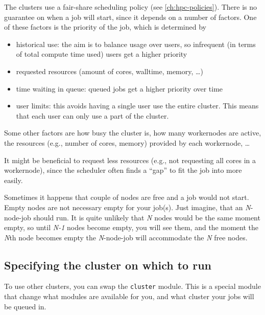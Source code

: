 The \hpcInfra clusters use a fair-share scheduling policy (see \autoref{ch:hpc-policies}). There is no guarantee on when a
job will start, since it depends on a number of factors. One of these factors is
the priority of the job, which is determined by
\begin{itemize}
    \item historical use: the aim is to balance usage over users, so
        infrequent (in terms of total compute time used) users get a higher priority

    \item requested resources (amount of cores, walltime, memory, \ldots)

    \item time waiting in queue: queued jobs get a higher priority over time

    \item user limits: this avoids having a single user use the entire cluster.
        This means that each user can only use a part of the cluster.

\end{itemize}
Some other factors are how busy the cluster is, how many workernodes are active,
the resources (e.g., number of cores, memory) provided by each workernode, \ldots

It might be beneficial to request less resources (e.g., not requesting all cores
in a workernode), since the scheduler often finds a ``gap'' to fit the job into
more easily.

Sometimes it happens that couple of nodes are free and a job would not start.
Empty nodes are not necessary empty for your job(s). Just imagine, that an
\emph{N}-node-job should run. It is quite unlikely that \emph{N} nodes would be the same moment empty,
so until \emph{N-1} nodes become empty, you will see them, and the moment the \emph{N}th node
becomes empty the \emph{N}-node-job will accommodate the \emph{N} free nodes.

\fi

\ifgent

\subsection{Specifying the cluster on which to run}
\label{subsec:specifying-the-cluster-on-which-to-run}

To use other clusters, you can swap the \lstinline|cluster| module.
This is a special module that change what modules are available for you,
and what cluster your jobs will be queued in.

